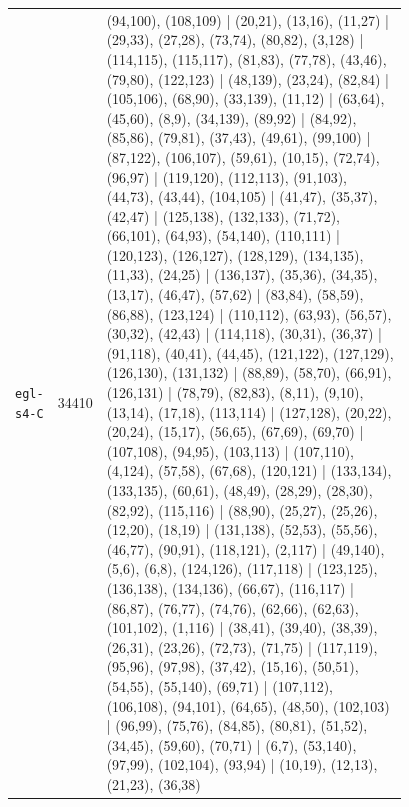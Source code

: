 \begin{landscape}
\begin{longtable}{lr>{\tiny\raggedright\arraybackslash}p{0.78\linewidth}}
\texttt{egl-s4-C} & 34410 & (94,100), (108,109) | (20,21), (13,16), (11,27) | (29,33), (27,28), (73,74), (80,82), (3,128) | (114,115), (115,117), (81,83), (77,78), (43,46), (79,80), (122,123) | (48,139), (23,24), (82,84) | (105,106), (68,90), (33,139), (11,12) | (63,64), (45,60), (8,9), (34,139), (89,92) | (84,92), (85,86), (79,81), (37,43), (49,61), (99,100) | (87,122), (106,107), (59,61), (10,15), (72,74), (96,97) | (119,120), (112,113), (91,103), (44,73), (43,44), (104,105) | (41,47), (35,37), (42,47) | (125,138), (132,133), (71,72), (66,101), (64,93), (54,140), (110,111) | (120,123), (126,127), (128,129), (134,135), (11,33), (24,25) | (136,137), (35,36), (34,35), (13,17), (46,47), (57,62) | (83,84), (58,59), (86,88), (123,124) | (110,112), (63,93), (56,57), (30,32), (42,43) | (114,118), (30,31), (36,37) | (91,118), (40,41), (44,45), (121,122), (127,129), (126,130), (131,132) | (88,89), (58,70), (66,91), (126,131) | (78,79), (82,83), (8,11), (9,10), (13,14), (17,18), (113,114) | (127,128), (20,22), (20,24), (15,17), (56,65), (67,69), (69,70) | (107,108), (94,95), (103,113) | (107,110), (4,124), (57,58), (67,68), (120,121) | (133,134), (133,135), (60,61), (48,49), (28,29), (28,30), (82,92), (115,116) | (88,90), (25,27), (25,26), (12,20), (18,19) | (131,138), (52,53), (55,56), (46,77), (90,91), (118,121), (2,117) | (49,140), (5,6), (6,8), (124,126), (117,118) | (123,125), (136,138), (134,136), (66,67), (116,117) | (86,87), (76,77), (74,76), (62,66), (62,63), (101,102), (1,116) | (38,41), (39,40), (38,39), (26,31), (23,26), (72,73), (71,75) | (117,119), (95,96), (97,98), (37,42), (15,16), (50,51), (54,55), (55,140), (69,71) | (107,112), (106,108), (94,101), (64,65), (48,50), (102,103) | (96,99), (75,76), (84,85), (80,81), (51,52), (34,45), (59,60), (70,71) | (6,7), (53,140), (97,99), (102,104), (93,94) | (10,19), (12,13), (21,23), (36,38) \\[2pt]
\end{longtable}
\endgroup
\end{landscape}
\restoregeometry